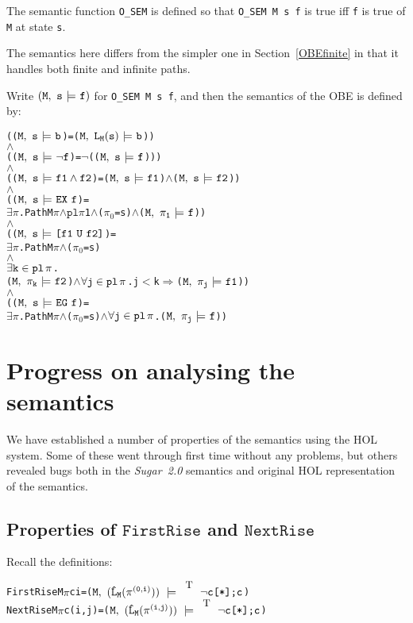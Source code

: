 \documentclass{llncs}
\newcommand{\And}{\(\wedge\)}
\newcommand{\Imp}{\(\Rightarrow\)}
\newcommand{\Not}{\(\neg\)}
\newcommand{\Exists}{\(\exists\)}
\newcommand{\Le}{\(<\)}
\newcommand{\T}{\texttt{\small\rm{T}}}
\newcommand{\bTrue}{\T}
\renewcommand{\Pi}{\(\pi\)}
\newcommand{\BSem}[3]{(\(\tt#1,~#2~{\models}~#3\))}
\newcommand{\SSem}[4]{(\(\tt{#1,~#2~\models^{\hspace*{-2.3mm}\raisebox{1mm}{\tt#3}}~#4}\))}
\newcommand{\OSem}[3]{(\(\tt{#1,~#2~{\models}~#3}\))}
\newcommand{\Osem}{\texttt{O\_SEM}\xspace}
\newcommand{\oSem}[3]{(\tt{#1,~#2~{\models}~#3})}
\newcommand{\Pl}{\(\texttt{pl}\xspace\)}
\newcommand{\pl}{\texttt{pl}\xspace}
\newcommand{\ResExists}[2]{\(\exists{\tt#1}\in\pl\hspace*{0.5mm}#2\)}
\newcommand{\ResForall}[2]{\(\forall{\tt#1}\in\pl\hspace*{0.5mm}#2\)}
\newcommand{\bNot}[1]{\neg#1}
\newcommand{\pathEl}[2]{#1_{#2}}
\newcommand{\PathEl}[2]{\(#1_{#2}\)}
\newcommand{\pathSeg}[2]{#1^{#2}}
\newcommand{\lHat}[1]{\hat{\texttt{L}}_{#1}}
\newcommand{\lNoHat}[1]{{\texttt{L}}_{#1}}
\newcommand{\sBool}[1]{#1}
\newcommand{\oBool}[1]{#1}
\newcommand{\oNot}[1]{\neg#1}
\newcommand{\sRepeat}[1]{#1\texttt{[*]}}
\newcommand{\sCat}[2]{#1\texttt{;}#2}
\newcommand{\oAnd}[2]{#1\wedge#2}
\newcommand{\oEx}[1]{{\texttt{EX}}~#1}
\newcommand{\oEg}[1]{{\texttt{EG}}~#1}
\newcommand{\oEu}[2]{\texttt{[}#1~{\texttt{U}}~#2\texttt{]}}
\newcommand\Sugar{{\it{Sugar~2.0}}\xspace}
\newcommand\Hol{HOL\xspace}
\newcommand\HOL{\Hol}
\renewcommand{\t}[1]{\texttt{#1}}
\begin{document}
The semantic function \Osem is defined so that
\texttt{\Osem~M~s~f} is true iff \texttt{f} is true of \texttt{M} at
state \texttt{s}.

The semantics here differs from the simpler one in Section~\ref{OBEfinite}
in that it handles both finite and infinite paths.

Write $\oSem{M}{s}{f}$ for \texttt{\Osem~M~s~f}, and then the semantics of the OBE is defined by:

{\begin{alltt}
   (\OSem{M}{s}{\oBool{b}} = {\BSem{M}{\lNoHat{M}(s)}{b}})
   {\And}
   (\OSem{M}{s}{\oNot{f}} = {\Not}(\OSem{M}{s}{f})) 
   {\And}
   (\OSem{M}{s}{\oAnd{f1}{f2}} = \OSem{M}{s}{f1} {\And} \OSem{M}{s}{f2})
   {\And}
   (\OSem{M}{s}{\oEx{f}} = 
     {\Exists}{\Pi}. Path M {\Pi} {\And} \Pl \Pi 1 {\And} (\PathEl{{\pi}}{0} = s) {\And} \OSem{M}{\pathEl{{\pi}}{1}}{f})
   {\And}
   (\OSem{M}{s}{\oEu{f1}{f2}} = 
     {\Exists}{\Pi}. Path M {\Pi} {\And} (\PathEl{{\pi}}{0} = s)
         {\And} 
         {\ResExists{k}{\pi}}. 
           \OSem{M}{\pathEl{{\pi}}{k}}{f2} {\And} {\ResForall{j}{\pi}}. j {\Le} k {\Imp} \OSem{M}{\pathEl{{\pi}}{j}}{f1})
   {\And}
   (\OSem{M}{s}{\oEg{f}} = 
     {\Exists}{\Pi}. Path M {\Pi} {\And} (\PathEl{{\pi}}{0} = s) {\And} {\ResForall{j}{\pi}}. \OSem{M}{\pathEl{{\pi}}{j}}{f})
\end{alltt}}

\section{Progress on analysing the semantics}\label{progress}

We have established a number of properties of the semantics using the \HOL system.
Some of these went through first time without any problems,
but others revealed bugs both in the \Sugar semantics and  original HOL representation
of the semantics.

\subsection{Properties of $\t{FirstRise}$ and $\t{NextRise}$}

Recall the definitions:


{\begin{alltt}
   FirstRise M {\Pi} c i    = \SSem{M}{(\lHat{M} (\pathSeg{\pi}{(0,i)}))}{\bTrue}{\sCat{\sRepeat{\sBool{\bNot{c}}}}{\sBool{c}}}
   NextRise M {\Pi} c (i,j) = \SSem{M}{(\lHat{M} (\pathSeg{\pi}{(i,j)}))}{\bTrue}{\sCat{\sRepeat{\sBool{\bNot{c}}}}{\sBool{c}}}
\end{alltt}}
\end{document}
